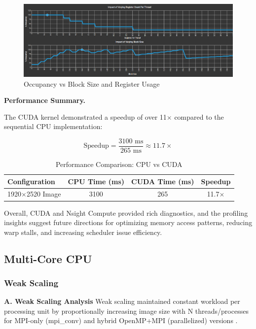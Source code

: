 \documentclass[conference, 10pt]{IEEEtran}
\begin{document}
\begin{figure}[H]
    \centering
    \includegraphics[width=0.9\linewidth]{figures/ImpactOfVarying.png}
    \caption{Occupancy vs Block Size and Register Usage}
    \label{fig:occupancy-block}
\end{figure}

\textbf{Performance Summary.}

The CUDA kernel demonstrated a speedup of over 11$\times$ compared to the sequential CPU implementation:

\[
\text{Speedup} = \frac{3100\text{ ms}}{265\text{ ms}} \approx 11.7\times
\]

\begin{table}[H]
    \centering
    \caption{Performance Comparison: CPU vs CUDA}
    \label{tab:speedup-table}
    \begin{tabular}{@{}lccc@{}}
        \toprule
        \textbf{Configuration} & \textbf{CPU Time (ms)} & \textbf{CUDA Time (ms)} & \textbf{Speedup} \\
        \midrule
        1920$\times$2520 Image & 3100 & 265 & 11.7$\times$ \\
        \bottomrule
    \end{tabular}
\end{table}

Overall, CUDA and Nsight Compute provided rich diagnostics, and the profiling insights suggest future directions for optimizing memory access patterns, reducing warp stalls, and increasing scheduler issue efficiency.





\subsection{\textbf{Multi-Core CPU}}

\subsubsection{\textbf{Weak Scaling}}

\textbf{A. Weak Scaling Analysis}
Weak scaling maintained constant workload per processing unit by proportionally increasing image size with N threads/processes for MPI-only (mpi\_conv) and hybrid OpenMP+MPI (parallelized) versions \cite{Gustafson1988}.
\end{document}
